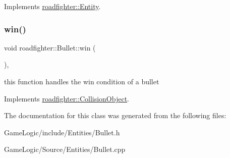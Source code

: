 Implements \hyperlink{classroadfighter_1_1Entity_a54c00f1af306290bae3e4b84e196566b}{roadfighter\+::\+Entity}.

\mbox{\label{classroadfighter_1_1Bullet_a566adb0235665312365cd65536c2aafc}} 
\subsubsection{\texorpdfstring{win()}{win()}}
{\footnotesize\ttfamily void roadfighter\+::\+Bullet\+::win (\begin{DoxyParamCaption}{ }\end{DoxyParamCaption})\hspace{0.3cm}{\ttfamily [override]}, {\ttfamily [virtual]}}

this function handles the win condition of a bullet 

Implements \hyperlink{classroadfighter_1_1CollisionObject_a03ce1ae52676088839d85c597743052c}{roadfighter\+::\+Collision\+Object}.



The documentation for this class was generated from the following files\+:\begin{DoxyCompactItemize}
\item 
Game\+Logic/include/\+Entities/Bullet.\+h\item 
Game\+Logic/\+Source/\+Entities/Bullet.\+cpp\end{DoxyCompactItemize}
